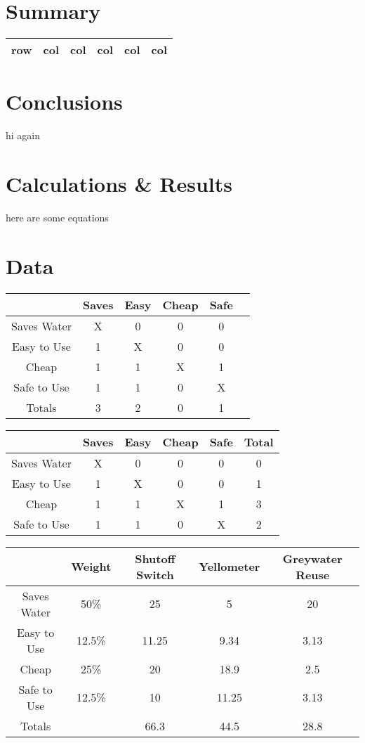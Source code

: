 \documentclass[11pt,letterpaper]{report}
\begin{document}

\pagebreak

\section*{Summary}
\begin{tabular}{ | c | c | c | c | c | c | }
\hline
row & col & col & col & col & col \\
\hline
\end{tabular}

\section*{Conclusions}
hi again

\section*{Calculations \& Results}
here are some equations

\section*{Data}
\begin{tabular}{ | c | c | c | c | c | c |}
\hline
 & Saves & Easy & Cheap & Safe \\
\hline
Saves Water & X & 0 & 0 & 0 \\
Easy to Use & 1 & X & 0 & 0 \\ 
Cheap & 1 & 1 & X & 1 \\
Safe to Use & 1 & 1 & 0 & X \\
\hline
Totals & 3 & 2 & 0 & 1 \\
\hline
\end{tabular}

\vspace{1cm}

\begin{tabular}{ | c | c | c | c | c | c |}
\hline
 & Saves & Easy & Cheap & Safe & Total \\
\hline
Saves Water & X & 0 & 0 & 0  & 0 \\
Easy to Use & 1 & X & 0 & 0 & 1\\ 
Cheap & 1 & 1 & X & 1 & 3\\
Safe to Use & 1 & 1 & 0 & X & 2\\
\hline
\end{tabular}

\vspace{1cm}

\begin{tabular}{ | c | c | c | c | c |}
\hline
 & Weight & Shutoff Switch & Yellometer & Greywater Reuse \\
\hline
Saves Water & 50\% & 25 & 5 & 20 \\
Easy to Use & 12.5\% & 11.25 & 9.34 & 3.13 \\ 
Cheap & 25\% & 20 & 18.9 & 2.5 \\
Safe to Use & 12.5\% & 10 & 11.25 & 3.13 \\
\hline
Totals & & 66.3 & 44.5 & 28.8 \\
\hline
\end{tabular}
\end{document}
